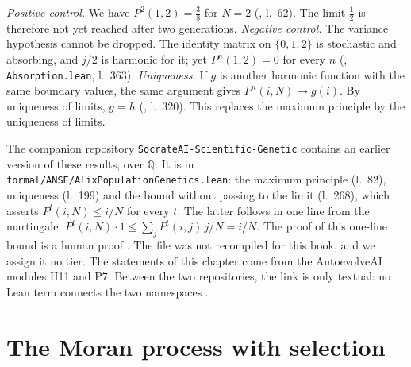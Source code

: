 \begin{remark}\label{ch4:rem:wfctl}
\emph{Positive control.} We have $P^2(1,2)=\frac38$ for $N=2$ (, l.~62). The limit
$\frac12$ is therefore not yet reached after two generations.
\emph{Negative control.} The variance hypothesis cannot be dropped. The identity matrix on $\{0,1,2\}$
is stochastic and absorbing, and $j/2$ is harmonic for it; yet $P^n(1,2)=0$ for every $n$
(, \texttt{Absorption.lean}, l.~363).
\emph{Uniqueness.} If $g$ is another harmonic function with the same boundary values, the same argument gives
$P^n(i,N)\to g(i)$. By uniqueness of limits, $g=h$ (, l.~320). This replaces the
maximum principle by the uniqueness of limits.
\end{remark}

\begin{remark}\label{ch4:rem:genetic}
The companion repository \texttt{SocrateAI-Scientific-Genetic} \cite{ch4:Genetic} contains an earlier version of these results, over
$\mathbb Q$. It is in \texttt{formal/ANSE/}\allowbreak\texttt{AlixPopulationGenetics.lean}: the maximum principle
 (l.~82), uniqueness  (l.~199) and the bound
without passing to the limit  (l.~268), which asserts $P^t(i,N)\le i/N$ for every $t$.
The latter follows in one line from the martingale:
$P^t(i,N)\cdot1\le\sum_jP^t(i,j)\,j/N=i/N$. The proof of this one-line bound is a human proof \tierC. The file
was not recompiled for this book, and we assign it no tier. The statements of this chapter
come from the AutoevolveAI modules H11 and P7. Between the two repositories, the link is only textual: no Lean
term connects the two namespaces \tierC.
\end{remark}

\section{The Moran process with selection}\label{ch4:sec:moran}

